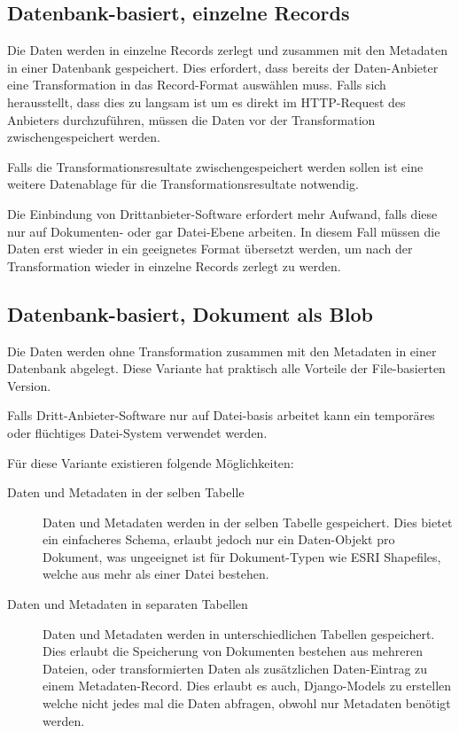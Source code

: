 \subsection{Datenbank-basiert, einzelne Records}\label{sec:pd:datenbank-records}
Die Daten werden in einzelne Records zerlegt und zusammen mit den Metadaten in einer Datenbank gespeichert. Dies erfordert, dass bereits der Daten-Anbieter eine Transformation in das Record-Format auswählen muss. Falls sich herausstellt, dass dies zu langsam ist um es direkt im HTTP-Request des Anbieters durchzuführen, müssen die Daten vor der Transformation zwischengespeichert werden.

Falls die Transformationsresultate zwischengespeichert werden sollen ist eine weitere Datenablage für die Transformationsresultate notwendig.

Die Einbindung von Drittanbieter-Software erfordert mehr Aufwand, falls diese nur auf Dokumenten- oder gar Datei-Ebene arbeiten. In diesem Fall müssen die Daten erst wieder in ein geeignetes Format übersetzt werden, um nach der Transformation wieder in einzelne Records zerlegt zu werden.

\subsection{Datenbank-basiert, Dokument als Blob}
Die Daten werden ohne Transformation zusammen mit den Metadaten in einer Datenbank abgelegt. Diese Variante hat praktisch alle Vorteile der File-basierten Version.

Falls Dritt-Anbieter-Software nur auf Datei-basis arbeitet kann ein temporäres oder flüchtiges Datei-System verwendet werden.

Für diese Variante existieren folgende Möglichkeiten:
\begin{description}
\item[Daten und Metadaten in der selben Tabelle] Daten und Metadaten werden in der selben Tabelle gespeichert. Dies bietet ein einfacheres Schema, erlaubt jedoch nur ein Daten-Objekt pro Dokument, was ungeeignet ist für Dokument-Typen wie ESRI Shapefiles, welche aus mehr als einer Datei bestehen.
\item[Daten und Metadaten in separaten Tabellen] Daten und Metadaten werden in unterschiedlichen Tabellen gespeichert. Dies erlaubt die Speicherung von Dokumenten bestehen aus mehreren Dateien, oder transformierten Daten als zusätzlichen Daten-Eintrag zu einem Metadaten-Record. Dies erlaubt es auch, Django-Models zu erstellen welche nicht jedes mal die Daten abfragen, obwohl nur Metadaten benötigt werden.
\end{description}


